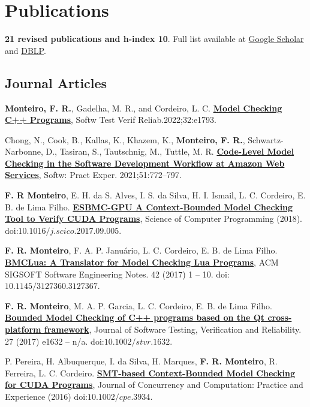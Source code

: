 \documentclass[letterpaper]{article}
\renewenvironment{itemize}{
  \begin{list}{}{
    \setlength{\leftmargin}{1.5em}
  }
}{
  \end{list}
}
\begin{document}
\section*{Publications}

{\bf 21 revised publications and h-index 10}. Full list available at \href{https://scholar.google.com/citations?hl=en&user=6bNQcz0AAAAJ}{Google Scholar} and \href{https://dblp.uni-trier.de/pers/hd/m/Monteiro:Felipe_R=}{DBLP}.

\subsection*{Journal Articles}

\begin{itemize}

\item {\bf Monteiro, F. R.}, Gadelha, M. R., and Cordeiro, L. C. \href{https://onlinelibrary.wiley.com/doi/pdf/10.1002/stvr.1793}{{\bf Model Checking C++ Programs}}, Softw Test Verif Reliab.2022;32:e1793.

\item Chong, N., Cook, B., Kallas, K., Khazem, K., {\bf Monteiro, F. R.}, Schwartz-Narbonne, D., Tasiran, S., Tautschnig, M., Tuttle, M. R. \href{https://onlinelibrary.wiley.com/doi/pdf/10.1002/spe.2949}{{\bf Code-Level Model Checking in the Software Development Workflow at Amazon Web Services}}, Softw: Pract Exper. 2021;51:772–797.

\item {\bf F. R Monteiro}, E. H. da S. Alves, I. S. da Silva, H. I. Ismail, L. C. Cordeiro, E. B. de Lima Filho. \href{http://www.sciencedirect.com/science/article/pii/S0167642317301934}{{\bf ESBMC-GPU A Context-Bounded Model Checking Tool to Verify CUDA Programs}}, Science of Computer Programming (2018). doi:$10.1016/j.scico.2017.09.005$.

\item {\bf F. R. Monteiro}, F. A. P. Janu\'{a}rio, L. C. Cordeiro, E. B. de Lima Filho. \href{https://dl.acm.org/citation.cfm?id=3127367}{{\bf BMCLua: A Translator for Model Checking Lua Programs}}, ACM SIGSOFT Software Engineering Notes. 42 (2017) 1 -- 10. doi:$10.1145/3127360.3127367$.

\item {\bf F. R. Monteiro}, M. A. P. Garcia, L. C. Cordeiro, E. B. de Lima Filho. \href{http://onlinelibrary.wiley.com/doi/10.1002/stvr.1632/full}{{\bf Bounded Model Checking of C++ programs based on the Qt cross-platform framework}}, Journal of Software Testing, Verification and Reliability. 27 (2017) e1632 -- n/a. doi:$10.1002/stvr.1632$.

\item P. Pereira, H. Albuquerque, I. da Silva, H. Marques, {\bf F. R. Monteiro}, R. Ferreira, L. C. Cordeiro. \href{http://onlinelibrary.wiley.com/doi/10.1002/cpe.3934/full}{{\bf SMT-based Context-Bounded Model Checking for CUDA Programs}}, Journal of Concurrency and Computation: Practice and Experience (2016) doi:$10.1002/cpe.3934$.

\end{itemize}
\end{document}
